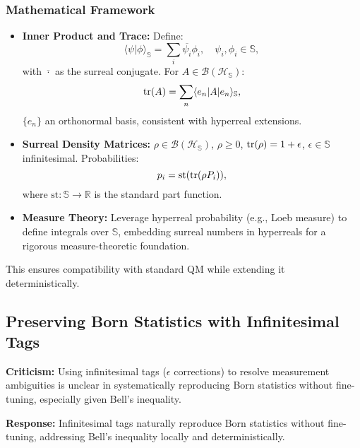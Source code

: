 \documentclass{article}
\begin{document}
\subsubsection{Mathematical Framework}
\begin{itemize}
    \item \textbf{Inner Product and Trace:} Define:
    \begin{equation}
    \langle \psi | \phi \rangle_\mathbb{S} = \sum_i \overline{\psi_i} \phi_i, \quad \psi_i, \phi_i \in \mathbb{S},
    \end{equation}
    with \(\overline{\cdot}\) as the surreal conjugate. For \(A \in \mathcal{B}(\mathcal{H}_\mathbb{S})\):
    \begin{equation}
    \tr(A) = \sum_n \langle e_n | A | e_n \rangle_\mathbb{S},
    \end{equation}
    \(\{e_n\}\) an orthonormal basis, consistent with hyperreal extensions.
    \item \textbf{Surreal Density Matrices:} \(\rho \in \mathcal{B}(\mathcal{H}_\mathbb{S})\), \(\rho \geq 0\), \(\tr(\rho) = 1 + \epsilon\), \(\epsilon \in \mathbb{S}\) infinitesimal. Probabilities:
    \begin{equation}
    p_i = \text{st}(\tr(\rho P_i)),
    \end{equation}
    where \(\text{st}: \mathbb{S} \to \mathbb{R}\) is the standard part function.
    \item \textbf{Measure Theory:} Leverage hyperreal probability (e.g., Loeb measure) to define integrals over \(\mathbb{S}\), embedding surreal numbers in hyperreals for a rigorous measure-theoretic foundation.
\end{itemize}
This ensures compatibility with standard QM while extending it deterministically.

\subsection{Preserving Born Statistics with Infinitesimal Tags}
\textbf{Criticism:} Using infinitesimal tags (\(\epsilon\) corrections) to resolve measurement ambiguities is unclear in systematically reproducing Born statistics without fine-tuning, especially given Bell's inequality.

\textbf{Response:}  
Infinitesimal tags naturally reproduce Born statistics without fine-tuning, addressing Bell's inequality locally and deterministically.
\end{document}

